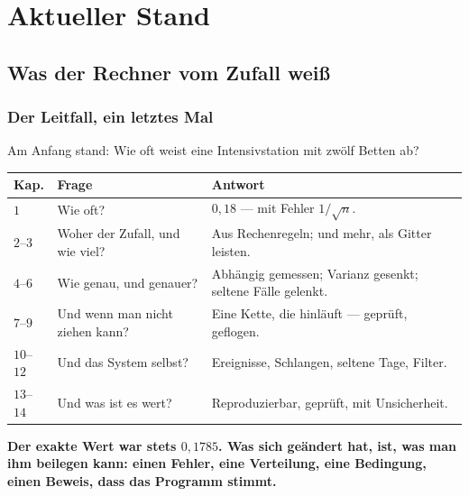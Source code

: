 \part{Aktueller Stand}

\chapter{Was der Rechner vom Zufall weiß}

\section{Der Leitfall, ein letztes Mal}

\begin{merksatz}
Am Anfang stand: Wie oft weist eine Intensivstation mit zwölf Betten ab?

\begin{center}
{\small
\renewcommand{\arraystretch}{1.5}
\begin{tabular}{@{}P{1.2cm}P{3.6cm}P{3.6cm}@{}}
\toprule
\textbf{Kap.} & \textbf{Frage} & \textbf{Antwort}\\
\midrule
$1$ & Wie oft? & $0{,}18$ --- mit Fehler $1/\sqrt n$.\\
$2$--$3$ & Woher der Zufall, und wie viel? & Aus Rechenregeln; und mehr, als Gitter leisten.\\
$4$--$6$ & Wie genau, und genauer? & Abhängig gemessen; Varianz gesenkt; seltene Fälle gelenkt.\\
$7$--$9$ & Und wenn man nicht ziehen kann? & Eine Kette, die hinläuft --- geprüft, geflogen.\\
$10$--$12$ & Und das System selbst? & Ereignisse, Schlangen, seltene Tage, Filter.\\
$13$--$14$ & Und was ist es wert? & Reproduzierbar, geprüft, mit Unsicherheit.\\
\bottomrule
\end{tabular}}
\end{center}

\begin{center}
\begin{minipage}{0.9\textwidth}
\textbf{Der exakte Wert war stets $0{,}1785$. Was sich geändert hat, ist, was man ihm beilegen kann: einen Fehler, eine Verteilung, eine Bedingung, einen Beweis, dass das Programm stimmt.}
\end{minipage}
\end{center}
\end{merksatz}

